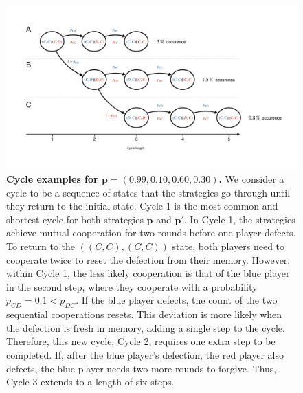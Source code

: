 \documentclass[11pt]{article}
\theoremstyle{plainCl1}
\theoremstyle{plainCl2}
\begin{document}
\begin{figure}
  \centering
\includegraphics[width=\textwidth]{../../figures/player_p_cycles.pdf}
\caption{\textbf{Cycle examples for \(\mathbf{p} = (0.99, 0.10, 0.60, 0.30)\).}
We consider a cycle to be a sequence of states that the strategies go through
until they return to the initial state. Cycle 1 is the most common and shortest
cycle for both strategies \(\mathbf{p}\) and \(\mathbf{p'}\). In Cycle 1, the
strategies achieve mutual cooperation for two rounds before one player defects.
To return to the \(((C, C), (C, C))\) state, both players need to cooperate
twice to reset the defection from their memory. However, within Cycle 1, the
less likely cooperation is that of the blue player in the second step, where
they cooperate with a probability \(p_{CD} = 0.1 < p_{DC}\). If the blue player
defects, the count of the two sequential cooperations resets. This deviation is
more likely when the defection is fresh in memory, adding a single step to the
cycle. Therefore, this new cycle, Cycle 2, requires one extra step to be
completed. If, after the blue player's defection, the red player also defects,
the blue player needs two more rounds to forgive. Thus, Cycle 3 extends to a
length of six steps.}
\end{figure}
\end{document}
